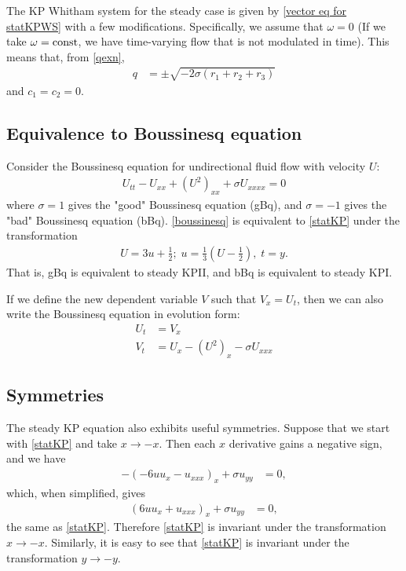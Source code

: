 \documentclass[12pt]{article}
\numberwithin{equation}{section}
\begin{document}
The KP Whitham system for the steady case is given by \eqref{vector eq for statKPWS} with a few modifications. Specifically, we assume that $\omega = 0$ (If we take $\omega = \rm const$, we have time-varying flow that is not modulated in time). This means that, from \eqref{qexn},
\begin{align}
    q  &=\pm \sqrt{-2\sigma(r_1+r_2+r_3)} \label{qexn, omega=0} 
\end{align}
and $c_1 = c_2=0$. 

\subsection{Equivalence to Boussinesq equation} \label{sec: equiv to bouss}
Consider the Boussinesq equation for undirectional fluid flow with velocity $U$:
\begin{align}
  U_{tt}-U_{xx} + (U^2)_{xx} + \sigma U_{xxxx} = 0
    \label{boussinesq}
\end{align}
where $\sigma = 1$ gives the "good" Boussinesq equation (gBq), and $\sigma = -1$ gives the "bad" Boussinesq equation (bBq). \eqref{boussinesq} is equivalent to \eqref{statKP} under the transformation
\begin{align}
    U = 3u + \frac{1}{2}; \; u = \frac{1}{3}\left(U - \frac{1}{2} \right), \; t = y.\label{trans bouss to kp}
\end{align}
That is, gBq is equivalent to steady KPII, and bBq is equivalent to steady KPI.

If we define the new dependent variable $V$ such that $V_x = U_t$, then we can also write the Boussinesq equation in evolution form:
\begin{subequations}
    \begin{align}
        U_t &= V_x \\
        V_t &= U_x - \left(U^2\right)_x - \sigma U_{xxx}
    \end{align} \label{boussinesq evolution}
\end{subequations}

\subsection{Symmetries} \label{sec: symmetries}
The steady KP equation also exhibits useful symmetries. Suppose that we start with \eqref{statKP} and take $x \to -x$. Then each $x$ derivative gains a negative sign, and we have 
\begin{align*}
    -(-6uu_x - u_{xxx})_x + \sigma u_{yy} &= 0,
\end{align*}
which, when simplified, gives
\begin{align*}
    (6uu_x + u_{xxx})_x + \sigma u_{yy} &= 0,
\end{align*}
the same as \eqref{statKP}. Therefore \eqref{statKP} is invariant under the transformation $x \to -x$. Similarly, it is easy to see that \eqref{statKP} is invariant under the transformation $y \to -y$. 
\end{document}
